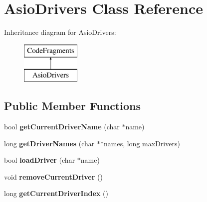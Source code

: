 \hypertarget{class_asio_drivers}{}\section{Asio\+Drivers Class Reference}
\label{class_asio_drivers}
Inheritance diagram for Asio\+Drivers\+:\begin{figure}[H]
\begin{center}
\leavevmode
\includegraphics[height=2.000000cm]{class_asio_drivers}
\end{center}
\end{figure}
\subsection*{Public Member Functions}
\begin{DoxyCompactItemize}
\item 
bool {\bfseries get\+Current\+Driver\+Name} (char $\ast$name)\hypertarget{class_asio_drivers_acd2692fb600f08dce08da8dcc7fbd544}{}\label{class_asio_drivers_acd2692fb600f08dce08da8dcc7fbd544}

\item 
long {\bfseries get\+Driver\+Names} (char $\ast$$\ast$names, long max\+Drivers)\hypertarget{class_asio_drivers_a871e8eb63d4c37c8ff73cb27b1a1ce22}{}\label{class_asio_drivers_a871e8eb63d4c37c8ff73cb27b1a1ce22}

\item 
bool {\bfseries load\+Driver} (char $\ast$name)\hypertarget{class_asio_drivers_adb8e7bf3008b854a652a7352e44e2ce1}{}\label{class_asio_drivers_adb8e7bf3008b854a652a7352e44e2ce1}

\item 
void {\bfseries remove\+Current\+Driver} ()\hypertarget{class_asio_drivers_ab8c8e12f903232df355affd1219a831f}{}\label{class_asio_drivers_ab8c8e12f903232df355affd1219a831f}

\item 
long {\bfseries get\+Current\+Driver\+Index} ()\hypertarget{class_asio_drivers_a4ff62d2d8922c9f90448bbc57c05b733}{}\label{class_asio_drivers_a4ff62d2d8922c9f90448bbc57c05b733}

\end{DoxyCompactItemize}
